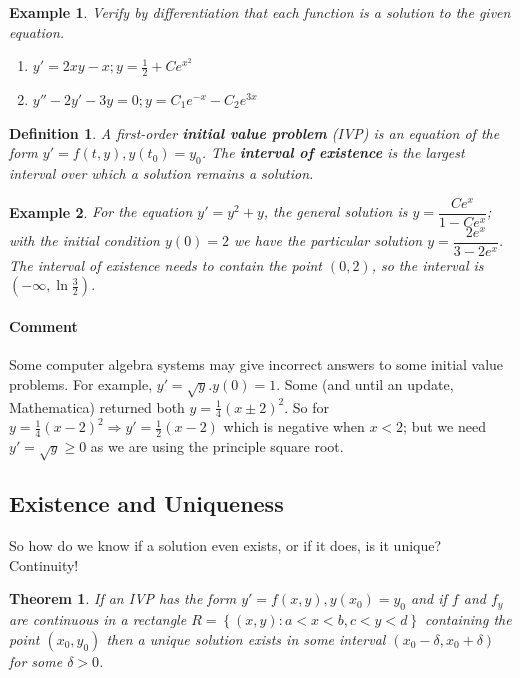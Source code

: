\documentclass[letterpaper, 11pt, openany]{book}
\theoremstyle{mytheoremstyle}
\newtheorem{theorem}{Theorem}[section]
\newtheorem{definition}{Definition}[section]
\theoremstyle{myexamplestyle}
\newtheorem{example}{Example}[section]
\newenvironment{commentary}{\paragraph{\sffamily \smaller \fontseries{b}\selectfont Comment}}{}
\begin{document}
\begin{example}\label{e:de-intro-check}
    Verify by differentiation that each function is a solution to the given equation.
    \begin{enumerate}
        \item \(y' = 2xy - x; y = \frac{1}{2} + Ce^{x^2}\)
        \item \(y'' - 2y' - 3y = 0; y = C_{1} e^{-x} - C_{2} e^{3x}\)
    \end{enumerate}
\end{example}

\begin{definition}\label{d:ivp}
    A first-order \textbf{initial value problem} (IVP) is an equation of the form \(y' = f(t,y), y(t_0) = y_0\). The \textbf{interval of existence} is the largest interval over which a solution remains a solution.
\end{definition}

\begin{example}\label{e:de-ioe}
    For the equation \(y' = y^{2} + y\), the general solution is \(y = \dfrac{Ce^{x}}{1 - Ce^{x}}\); with the initial condition \(y(0) = 2\) we have the particular solution \(y = \dfrac{2e^{x}}{3 - 2e^{x}}\). The interval of existence needs to contain the point \((0,2)\), so the interval is \(\left(-\infty, \ln \frac{3}{2}\right)\).
\end{example}

\begin{commentary}
    Some computer algebra systems may give incorrect answers to some initial value problems. For example, \(y' = \sqrt{y}. y(0) = 1\). Some (and until an update, Mathematica) returned both \(y = \frac{1}{4}(x\pm 2)^{2}\). So for \(y = \frac{1}{4}(x - 2)^{2} \Rightarrow y' = \frac{1}{2}(x-2)\) which is negative when \(x < 2\); but we need \(y' = \sqrt{y} \geq 0\) as we are using the principle square root.
 \end{commentary}

\subsection{Existence and Uniqueness}
So how do we know if a solution even exists, or if it does, is it unique? Continuity!
\begin{theorem}\label{t:de-exist-unique}
    If an IVP has the form \(y' = f(x,y), y(x_0) = y_0\) and if \(f\) and \(f_y\) are continuous in a rectangle \(R = \left\{(x,y) : a < x < b, c < y < d\right\}\) containing the point \((x_0, y_0)\) then a unique solution exists in some interval \((x_0 - \delta, x_0 + \delta)\) for some \(\delta > 0\).
\end{theorem}
\end{document}
